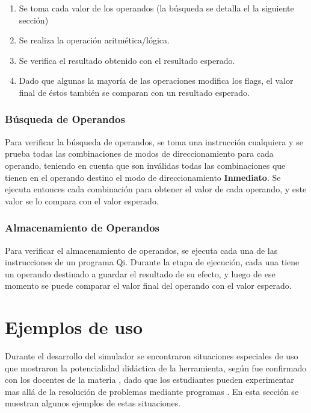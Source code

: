 \begin{enumerate}
\item Se toma cada valor de los operandos (la búsqueda se detalla el la siguiente sección)

\item Se realiza la operación aritmética/lógica. 

\item Se verifica el resultado obtenido con el resultado esperado.

\item Dado que algunas la mayoría de las operaciones modifica los flags, el valor final de éstos también se comparan con un resultado esperado. 
\end{enumerate}

\subsubsection{Búsqueda de Operandos}

Para verificar la búsqueda de operandos, se toma una instrucción cualquiera y se prueba todas las combinaciones de modos de direccionamiento para cada operando, teniendo en cuenta que son inválidas todas las combinaciones que tienen en el operando destino el modo de direccionamiento \textbf{Inmediato}. Se ejecuta entonces cada combinación para obtener el valor de cada operando, y este valor se lo compara con el valor esperado. 
 
\subsubsection{Almacenamiento de Operandos}

Para verificar el almacenamiento de operandos, se ejecuta cada una de las instrucciones de un programa Qi. Durante la etapa de ejecución, cada una tiene un operando destinado a guardar el resultado de su efecto, y luego de ese momento se puede comparar el valor final del operando con el valor esperado.

\section{Ejemplos de uso}\label{erroresconceptuales}

Durante el desarrollo del simulador se encontraron situaciones especiales de uso que mostraron la potencialidad didáctica de la herramienta, según fue confirmado con los docentes de la materia \orga, dado que los estudiantes pueden experimentar mas allá de la resolución de problemas mediante programas \qi. En esta sección se muestran algunos ejemplos de estas situaciones.

